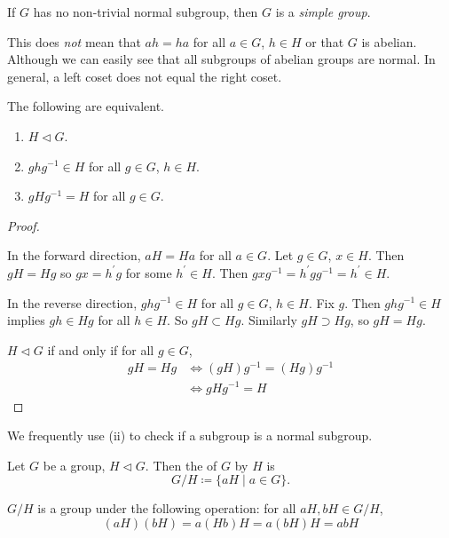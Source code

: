 If $G$ has no non-trivial normal subgroup, then $G$ is a \emph{simple group}.

\begin{remark}
This does \emph{not} mean that $ah=ha$ for all $a\in G$, $h\in H$ or that $G$ is abelian. Although we can easily see that all subgroups of abelian groups are normal. In general, a left coset does not equal the right coset.
\end{remark}

\begin{lemma}
The following are equivalent.
\begin{enumerate}[label=(\roman*)]
\item $H\triangleleft G$.
\item $ghg^{-1}\in H$ for all $g\in G$, $h\in H$.
\item $gHg^{-1}=H$ for all $g\in G$.
\end{enumerate}
\end{lemma}

\begin{proof} \

 In the forward direction, $aH=Ha$ for all $a\in G$. Let $g\in G$, $x\in H$. Then $gH=Hg$ so $gx=h^\prime g$ for some $h^\prime\in H$. Then $gxg^{-1}=h^\prime gg^{-1}=h^\prime\in H$.

In the reverse direction, $ghg^{-1}\in H$ for all $g\in G$, $h\in H$. Fix $g$. Then $ghg^{-1}\in H$ implies $gh\in Hg$ for all $h\in H$. So $gH\subset Hg$. Similarly $gH\supset Hg$, so $gH=Hg$.

 $H\triangleleft G$ if and only if for all $g\in G$,
\begin{align*}
gH=Hg&\iff(gH)g^{-1}=(Hg)g^{-1}\\
&\iff gHg^{-1}=H
\end{align*}
\end{proof}

\begin{remark}
We frequently use (ii) to check if a subgroup is a normal subgroup.
\end{remark}

\begin{definition}
Let $G$ be a group, $H\triangleleft G$. Then the  of $G$ by $H$ is
\[G/H\coloneqq\{aH\mid a\in G\}.\]
\end{definition}

\begin{lemma}
$G/H$ is a group under the following operation: for all $aH,bH\in G/H$,
\[(aH)(bH)=a(Hb)H=a(bH)H=abH\]
\end{lemma}

